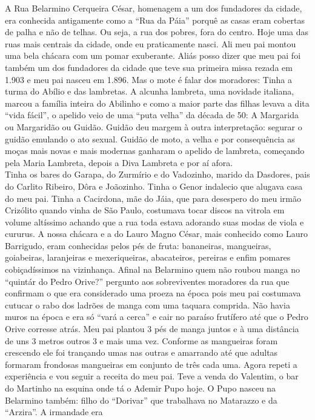 \documentclass[12pt,brazil,]{book}
\begin{document}
A Rua Belarmino Cerqueira César, homenagem a um dos fundadores da
cidade, era conhecida antigamente como a ``Rua da Páia'' porquê as casas
eram cobertas de palha e não de telhas. Ou seja, a rua dos pobres, fora
do centro. Hoje uma das ruas mais centrais da cidade, onde eu
praticamente nasci. Ali meu pai montou uma bela chácara com um pomar
exuberante. Aliás posso dizer que meu pai foi também um dos fundadores
da cidade que teve sua primeira missa rezada em 1.903 e meu pai nasceu
em 1.896. Mas o mote é falar dos moradores: Tinha a turma do Abílio e
das lambretas. A alcunha lambreta, uma novidade italiana, marcou a
família inteira do Abilinho e como a maior parte das filhas levava a
dita ``vida fácil'', o apelido veio de uma ``puta velha'' da década de
50: A Margarida ou Margaridão ou Guidão. Guidão deu margem à outra
interpretação: segurar o guidão emulando o ato sexual. Guidão de moto, a
velha e por consequência as moças mais novas e mais modernas ganharam o
apelido de lambreta, começando pela Maria Lambreta, depois a Diva
Lambreta e por aí afora.\\
Tinha os bares do Garapa, do Zurmírio e do Vadozinho, marido da
Dasdores, pais do Carlito Ribeiro, Dôra e Joãozinho. Tinha o Genor
indalecio que alugava casa do meu pai. Tinha a Cacirdona, mãe do Jáia,
que para desespero do meu irmão Crizólito quando vinha de São Paulo,
costumava tocar discos na vitrola em volume altíssimo achando que a rua
toda estava adorando suas modas de viola e cururus. A nossa chácara e a
do Lauro Magno César, mais conhecido como Lauro Barrigudo, eram
conhecidas pelos pés de fruta: bananeiras, mangueiras, goiabeiras,
laranjeiras e mexeriqueiras, abacateiros, pereiras e enfim pomares
cobiçadíssimos na vizinhança. Afinal na Belarmino quem não roubou manga
no ``quintár do Pedro Orive?'' pergunto aos sobreviventes moradores da
rua que confirmam o que era considerado uma proeza na época pois meu pai
costumava cutucar o rabo dos ladrões de manga com uma taquara comprida.
Não havia muros na época e era só ``vará a cerca'' e cair no paraíso
frutífero até que o Pedro Orive corresse atrás. Meu pai plantou 3 pés de
manga juntos e à uma distância de uns 3 metros outros 3 e mais uma vez.
Conforme as mangueiras foram crescendo ele foi trançando umas nas outras
e amarrando até que adultas formaram frondosas mangueiras em conjunto de
três cada uma. Agora repeti a experiência e vou seguir a receita do meu
pai. Teve a venda do Valentim, o bar do Martinho na esquina onde tá o
Ademir Pupo hoje. O Pupo nasceu na Belarmino também: filho do
``Dorivar'' que trabalhava no Matarazzo e da ``Arzira''. A irmandade era
\end{document}
